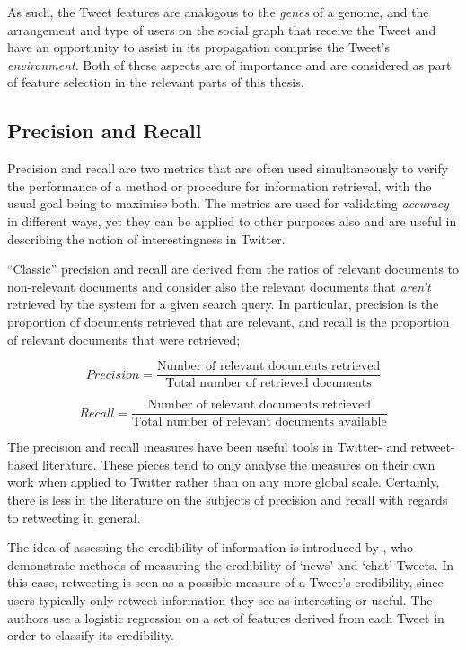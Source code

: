 As such, the Tweet features are analogous to the \textit{genes} of a genome, and the arrangement and type of users on the social graph that receive the Tweet and have an opportunity to assist in its propagation comprise the Tweet's \textit{environment}. Both of these aspects are of importance and are considered as part of feature selection in the relevant parts of this thesis.


\subsection{Precision and Recall}
Precision and recall are two metrics that are often used simultaneously to verify the performance of a method or procedure for information retrieval, with the usual goal being to maximise both. The metrics are used for validating \textit{accuracy} in different ways, yet they can be applied to other purposes also and are useful in describing the notion of interestingness in Twitter.

``Classic'' precision and recall are derived from the ratios of relevant documents to non-relevant documents and consider also the relevant documents that \textit{aren't} retrieved by the system for a given search query. In particular, precision is the proportion of documents retrieved that are relevant, and recall is the proportion of relevant documents that were retrieved;

\[	
	Precision = \frac{\text{Number of relevant documents retrieved}}{\text{Total number of retrieved documents}}
\]

\[
	Recall = \frac{\text{Number of relevant documents retrieved}}{\text{Total number of relevant documents available}}
\]

The precision and recall measures have been useful tools in Twitter- and retweet-based literature. These pieces tend to only analyse the measures on their own work when applied to Twitter rather than on any more global scale. Certainly, there is less in the literature on the subjects of precision and recall with regards to retweeting in general.

The idea of assessing the credibility of information is introduced by \citet{castillo11}, who demonstrate methods of measuring the credibility of `news' and `chat' Tweets. In this case, retweeting is seen as a possible measure of a Tweet's credibility, since users typically only retweet information they see as interesting or useful. The authors use a logistic regression on a set of features derived from each Tweet in order to classify its credibility. 

